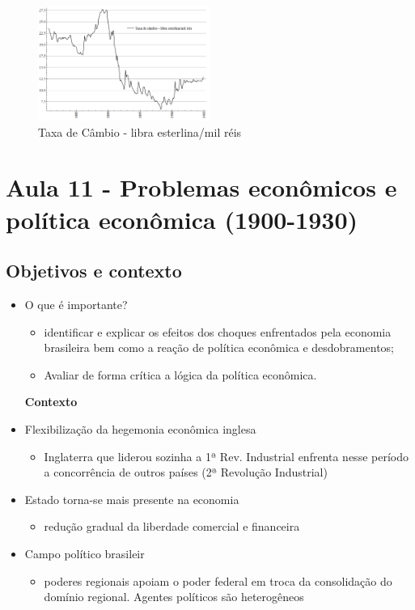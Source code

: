 \documentclass[a4paper,12pt]{article}[abntex2]
\begin{document}
\begin{figure}[H]
    \centering
    \includegraphics[width=0.5\textwidth]{Imagens Slides/i6a10.png}
    \caption{Taxa de Câmbio - libra esterlina/mil réis}
\end{figure}

\newpage

\section{\textbf{Aula 11 - Problemas econômicos e política econômica (1900-1930)}}

\subsection{\textbf{Objetivos e contexto}}
\begin{itemize}
    \item O que é importante?
    \begin{itemize}
        \item identificar e explicar os efeitos dos choques enfrentados pela economia brasileira bem como a reação de política econômica e desdobramentos;
    \end{itemize}
    \begin{itemize}
        \item Avaliar de forma crítica a lógica da política econômica.
    \end{itemize}
\textbf{Contexto}
    \item Flexibilização da hegemonia econômica inglesa
    \begin{itemize}
        \item  Inglaterra que liderou sozinha a 1ª Rev. Industrial enfrenta nesse período a concorrência de outros países (2ª Revolução Industrial)
    \end{itemize}
    \item Estado torna-se mais presente na economia
    \begin{itemize}
        \item redução gradual da liberdade comercial e financeira
    \end{itemize}
    \item Campo político brasileir
    \begin{itemize}
        \item  poderes regionais apoiam o poder federal em troca da consolidação do domínio regional. Agentes políticos são heterogêneos
    \end{itemize}
\end{itemize}
\end{document}
